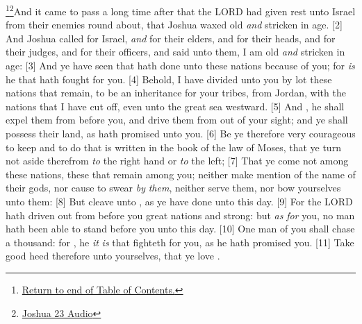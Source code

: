 \footnote{\textcolor[rgb]{0.00,0.25,0.00}{\hyperlink{TOC}{Return to end of Table of Contents.}}}\footnote{\href{https://audiobible.com/bible/joshua_23.html}{\textcolor[cmyk]{0.99998,1,0,0}{Joshua 23 Audio}}}\textcolor[cmyk]{0.99998,1,0,0}{And it came to pass a long time after that the LORD had given rest unto Israel from  their enemies round about, that Joshua waxed old \emph{and} stricken in age.}
[2] \textcolor[cmyk]{0.99998,1,0,0}{And Joshua called for  Israel, \emph{and} for their elders, and for their heads, and for their judges, and for their officers, and said unto them, I am old \emph{and} stricken in age:}
[3] \textcolor[cmyk]{0.99998,1,0,0}{And ye have seen  that  hath done unto  these nations because of you; for  \emph{is} he that hath fought for you.}
[4] \textcolor[cmyk]{0.99998,1,0,0}{Behold, I have divided unto you by lot these nations that remain, to be an inheritance for your tribes, from Jordan, with  the nations that I have cut off, even unto the great sea westward.}
[5] \textcolor[cmyk]{0.99998,1,0,0}{And , he shall expel them from before you, and drive them from out of your sight; and ye shall possess their land, as  hath promised unto you.}
[6] \textcolor[cmyk]{0.99998,1,0,0}{Be ye therefore very courageous to keep and to do  that is written in the book of the law of Moses, that ye turn not aside therefrom \emph{to} the right hand or \emph{to} the left;}
[7] \textcolor[cmyk]{0.99998,1,0,0}{That ye come not among these nations, these that remain among you; neither make mention of the name of their gods, nor cause to swear \emph{by} \emph{them}, neither serve them, nor bow yourselves unto them:}
[8] \textcolor[cmyk]{0.99998,1,0,0}{But cleave unto , as ye have done unto this day.}
[9] \textcolor[cmyk]{0.99998,1,0,0}{For the LORD hath driven out from before you great nations and strong: but \emph{as} \emph{for} you, no man hath been able to stand before you unto this day.}
[10] \textcolor[cmyk]{0.99998,1,0,0}{One man of you shall chase a thousand: for , he \emph{it} \emph{is} that fighteth for you, as he hath promised you.}
[11] \textcolor[cmyk]{0.99998,1,0,0}{Take good heed therefore unto yourselves, that ye love .}
